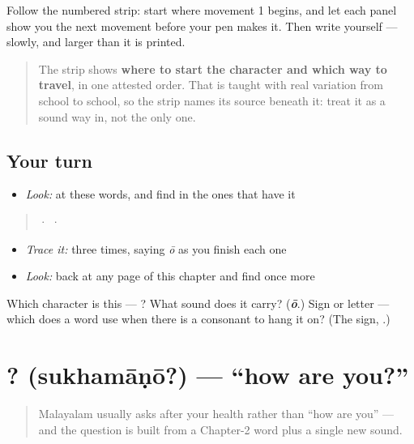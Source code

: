 Follow the numbered strip: start where movement 1 begins, and let each panel show you the next movement before your pen makes it. Then write  yourself — slowly, and larger than it is printed.

\begin{quote}
The strip shows \textbf{where to start the character and which way to travel}, in one attested order. That is taught with real variation from school to school, so the strip names its source beneath it: treat it as a sound way in, not the only one.
\end{quote}

\subsection*{Your turn}
\begin{itemize}
\raggedright
  \item \emph{Look:} at these words, and find  in the ones that have it
\end{itemize}

\begin{quote}
  ·    ·  
\end{quote}

\begin{itemize}
\raggedright
  \item \emph{Trace it:}  three times, saying \emph{ō} as you finish each one
  \item \emph{Look:} back at any page of this chapter and find  once more
\end{itemize}

\begin{tcolorbox}[breakable,colback=teal!4,colframe=teal!35!black,title={Before you move on}]
Which character is this — ? What sound does it carry? (\emph{\textbf{ō}}.) Sign or letter — which does a word use when there is a consonant to hang it on? (The sign, .)
\end{tcolorbox}
\section[\texorpdfstring{\ml{സുഖമാണോ}? (sukhamāṇō?)}{സുഖമാണോ? (sukhamāṇō?)}]{? (sukhamāṇō?) — \textquotedblleft{}how are you?\textquotedblright{}}

\label{lesson:ML-C03-sukhamaano}



\begin{quote}
Malayalam usually asks after your health rather than \textquotedblleft{}how are you\textquotedblright{} — and the question is built from a Chapter-2 word plus a single new sound.
\end{quote}

